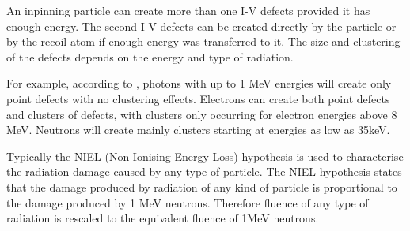 
An inpinning particle can create more than one I-V defects provided it has enough energy. The second I-V defects can be created directly by the particle or by the recoil atom if enough energy was transferred to it. The size and clustering of the defects depends on the energy and type of radiation. 


For example, according to \cite{MMoll}, photons with up to 1 MeV energies will create only point defects with no clustering effects. Electrons can create both point defects and clusters of defects, with clusters only occurring for electron energies above 8 MeV. Neutrons will create mainly clusters starting at energies as low as 35keV. 

Typically the NIEL (Non-Ionising Energy Loss) hypothesis is used to characterise the radiation damage caused by any type of particle. The NIEL hypothesis states that the damage produced by radiation of any kind of particle is proportional to the damage produced by 1 MeV neutrons. Therefore fluence of any type of radiation is rescaled to the equivalent fluence of 1MeV neutrons. %

